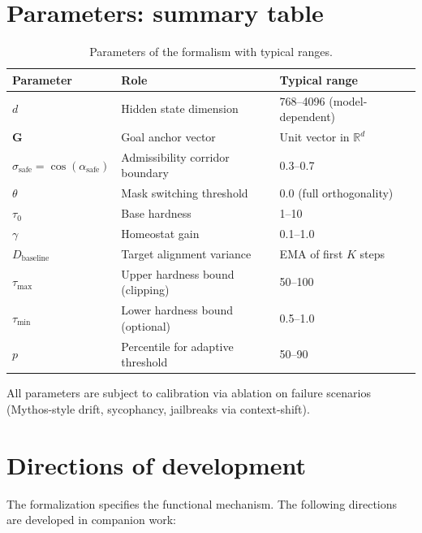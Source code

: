 \documentclass[12pt,a4paper]{article}
\begin{document}
\section{Parameters: summary table}

\begin{table}[h]
\centering
\begin{tabular}{lll}
\toprule
\textbf{Parameter} & \textbf{Role} & \textbf{Typical range} \\
\midrule
$d$ & Hidden state dimension & 768--4096 (model-dependent) \\
$\mathbf{G}$ & Goal anchor vector & Unit vector in $\mathbb{R}^d$ \\
$\sigma_{\text{safe}} = \cos(\alpha_{\text{safe}})$ & Admissibility corridor boundary & 0.3--0.7 \\
$\theta$ & Mask switching threshold & 0.0 (full orthogonality) \\
$\tau_0$ & Base hardness & 1--10 \\
$\gamma$ & Homeostat gain & 0.1--1.0 \\
$D_{\text{baseline}}$ & Target alignment variance & EMA of first $K$ steps \\
$\tau_{\max}$ & Upper hardness bound (clipping) & 50--100 \\
$\tau_{\min}$ & Lower hardness bound (optional) & 0.5--1.0 \\
$p$ & Percentile for adaptive threshold & 50--90 \\
\bottomrule
\end{tabular}
\caption{Parameters of the formalism with typical ranges.}
\end{table}

All parameters are subject to calibration via ablation on failure scenarios (Mythos-style drift, sycophancy, jailbreaks via context-shift).

\section{Directions of development}

The formalization specifies the functional mechanism. The following directions are developed in companion work:
\end{document}
